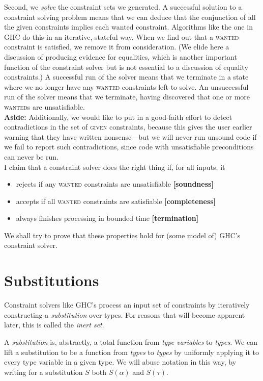 \documentclass[10pt, letterpaper, oneside]{article}
\newcommand{\given}  {\textsc{given} \xpsace}
\newcommand{\wanted} {\textsc{wanted}\xspace}
\begin{document}
Second, we \emph{solve} the constraint sets we generated. A successful solution to a constraint solving problem means that we can deduce that the conjunction of all the given constraints implies each wanted constraint. Algorithms like the one in GHC do this in an iterative, stateful way. When we find out that a \wanted constraint is satisfied, we remove it from consideration. (We elide here a discussion of producing evidence for equalities, which is another important function of the constraint solver but is not essential to a discussion of equality constraints.) A successful run of the solver means that we terminate in a state where we no longer have any \wanted constraints left to solve. An unsuccessful run of the solver means that we terminate, having discovered that one or more {\wanted}s are unsatisfiable.\\

\textbf{Aside:} Additionally, we would like to put in a good-faith effort to detect contradictions in the set of \given constraints, because this gives the user earlier warning that they have written nonsense---but we will never run unsound code if we fail to report such contradictions, since code with unsatisfiable preconditions can never be run.\\

I claim that a constraint solver does the right thing if, for all inputs, it
\begin{itemize}
\item rejects if any \wanted constraints are unsatisfiable \textbf{[soundness]}
\item accepts if all \wanted constraints are satisfiable \textbf{[completeness]}
\item always finishes processing in bounded time \textbf{[termination]}
\end{itemize}

We shall try to prove that these properties hold for (some model of) GHC's constraint solver.

\section{Substitutions}

Constraint solvers like GHC's process an input set of constraints by iteratively constructing a \emph{substitution} over types. For reasons that will become apparent later, this is called the \emph{inert set}.

A \emph{substitution} is, abstractly, a total function from \emph{type variables} to \emph{types}. We can lift a substitution to be a function from \emph{types} to \emph{types} by uniformly applying it to every type variable in a given type. We will abuse notation in this way, by writing for a substitution \(S\) both \(S(\alpha)\) and \(S(\tau)\).
\end{document}
